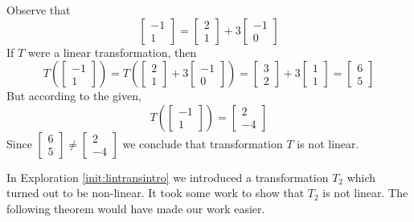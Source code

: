 \documentclass{ximera}
\begin{document}
\begin{example}
\begin{explanation} Observe that
$$\begin{bmatrix}
-1\\
1
\end{bmatrix}=\begin{bmatrix}
2\\
1
\end{bmatrix}+3\begin{bmatrix}
-1\\
0
\end{bmatrix}$$
If $T$ were a linear transformation, then $$T\left(\begin{bmatrix}
-1\\
1
\end{bmatrix}\right)=T\left(\begin{bmatrix}
2\\
1
\end{bmatrix}+3\begin{bmatrix}
-1\\
0
\end{bmatrix}\right)=\begin{bmatrix}
3\\
2
\end{bmatrix}+3\begin{bmatrix}
1\\
1
\end{bmatrix}=\begin{bmatrix}
6\\
5
\end{bmatrix}$$
But according to the given,
$$T\left(\begin{bmatrix}-1\\1\end{bmatrix}\right)=\begin{bmatrix}2\\-4\end{bmatrix}$$
Since $\begin{bmatrix}
6\\
5
\end{bmatrix}\neq \begin{bmatrix}
2\\
-4
\end{bmatrix}$
we conclude that transformation $T$ is not linear.
\end{explanation}
\end{example}

In Exploration \ref{init:lintransintro} we introduced a transformation $T_2$ which turned out to be non-linear.  It took some work to show that $T_2$ is not linear.  The following theorem would have made our work easier.
\end{document}

